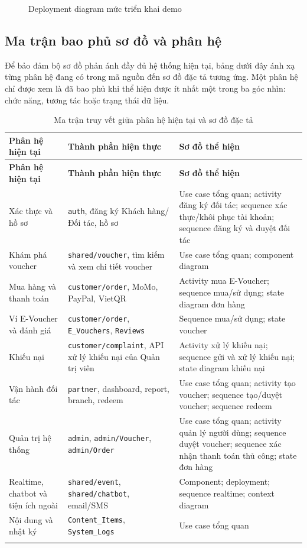 \begin{figure}[H]
\centering
{}
\caption{Deployment diagram mức triển khai demo}
\end{figure}

\subsection{Ma trận bao phủ sơ đồ và phân hệ}

Để bảo đảm bộ sơ đồ phản ánh đầy đủ hệ thống hiện tại, bảng dưới đây ánh xạ từng phân hệ đang có trong mã nguồn đến sơ đồ đặc tả tương ứng. Một phân hệ chỉ được xem là đã bao phủ khi thể hiện được ít nhất một trong ba góc nhìn: chức năng, tương tác hoặc trạng thái dữ liệu.

\begin{longtable}{|p{3.2cm}|p{4.0cm}|p{6.2cm}|}
\hline
\textbf{Phân hệ hiện tại} & \textbf{Thành phần hiện thực} & \textbf{Sơ đồ thể hiện} \\ \hline
\endfirsthead
\hline
\textbf{Phân hệ hiện tại} & \textbf{Thành phần hiện thực} & \textbf{Sơ đồ thể hiện} \\ \hline
\endhead
Xác thực và hồ sơ & \texttt{auth}, đăng ký Khách hàng/Đối tác, hồ sơ & Use case tổng quan; activity đăng ký đối tác; sequence xác thực/khôi phục tài khoản; sequence đăng ký và duyệt đối tác \\ \hline
Khám phá voucher & \texttt{shared/voucher}, tìm kiếm và xem chi tiết voucher & Use case tổng quan; component diagram \\ \hline
Mua hàng và thanh toán & \texttt{customer/order}, MoMo, PayPal, VietQR & Activity mua E-Voucher; sequence mua/sử dụng; state diagram đơn hàng \\ \hline
Ví E-Voucher và đánh giá & \texttt{customer/order}, \texttt{E\_Vouchers}, \texttt{Reviews} & Sequence mua/sử dụng; state voucher \\ \hline
Khiếu nại & \texttt{customer/complaint}, API xử lý khiếu nại của Quản trị viên & Activity xử lý khiếu nại; sequence gửi và xử lý khiếu nại; state diagram khiếu nại \\ \hline
Vận hành đối tác & \texttt{partner}, dashboard, report, branch, redeem & Use case tổng quan; activity tạo voucher; sequence tạo/duyệt voucher; sequence redeem \\ \hline
Quản trị hệ thống & \texttt{admin}, \texttt{admin/Voucher}, \texttt{admin/Order} & Use case tổng quan; activity quản lý người dùng; sequence duyệt voucher; sequence xác nhận thanh toán thủ công; state đơn hàng \\ \hline
Realtime, chatbot và tiện ích ngoài & \texttt{shared/event}, \texttt{shared/chatbot}, email/SMS & Component; deployment; sequence realtime; context diagram \\ \hline
Nội dung và nhật ký & \texttt{Content\_Items}, \texttt{System\_Logs} & Use case tổng quan \\ \hline
\caption[]{Ma trận truy vết giữa phân hệ hiện tại và sơ đồ đặc tả}\\
\end{longtable}

